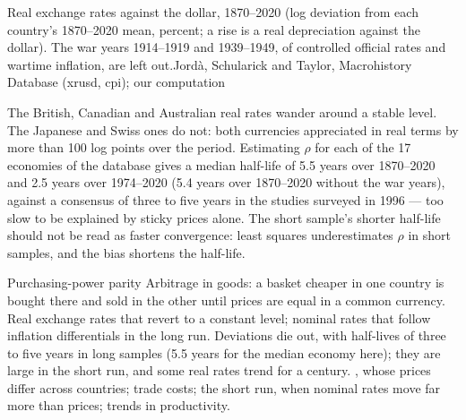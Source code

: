 \begin{omchart}{Real exchange rates against the dollar, 1870--2020 (log deviation
from each country's 1870--2020 mean, percent; a rise is a real depreciation against
the dollar). The war years 1914--1919 and 1939--1949, of controlled official rates
and wartime inflation, are left out.}{Jordà, Schularick and Taylor, Macrohistory Database (xrusd, cpi); our
computation}
\end{omchart}

The British, Canadian and Australian real rates wander around a stable level.
The Japanese and Swiss ones do not: both currencies appreciated in real terms by
more than 100 log points over the period. Estimating $\rho$ for each of the 17
economies of the database gives a median half-life of 5.5 years over 1870--2020 and
2.5 years over 1974--2020 (5.4 years over 1870--2020 without the war years), against a consensus of three to five years in the
studies surveyed in 1996 --- too slow to be explained by sticky prices alone.
The short sample's shorter half-life should not be read as faster convergence:
least squares underestimates $\rho$ in short samples, and the bias shortens the
half-life.

\begin{model}{Purchasing-power parity}
\assumes Arbitrage in goods: a basket cheaper in one country is bought there and
sold in the other until prices are equal in a common currency.
\predicts Real exchange rates that revert to a constant level; nominal rates that
follow inflation differentials in the long run.
\tested Deviations die out, with half-lives of three to five years in long samples
(5.5 years for the median economy here); they are large in the short run, and
some real rates trend for a century. %
\breaks {}, whose prices differ across countries; trade costs; the
short run, when nominal rates move far more than prices; trends in productivity.
\end{model}

